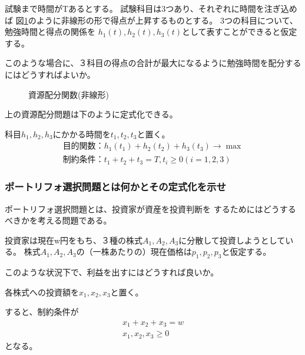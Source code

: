 \documentclass[9pt]{ltjsreport}
\begin{document}
試験まで時間がTあるとする。
試験科目は3つあり、それぞれに時間を注ぎ込めば
図\ref{fig:ResourceFunc}のように非線形の形で得点が上昇するものとする。
3つの科目について、勉強時間と得点の関係を
$h_1(t),h_2(t),h_3(t)$として表すことができると仮定する。

このような場合に、３科目の得点の合計が最大になるように勉強時間を配分するにはどうすればよいか。

\begin{figure}[h]
    \caption{資源配分関数(非線形)}
    \label{fig:ResourceFunc}
\begin{center}
\end{center}
\end{figure}

\hrulefill

上の資源配分問題は下のように定式化できる。

科目$h_1,h_2,h_3$にかかる時間を$t_1,t_2,t_3$と置く。
\begin{gather*}
    \text{目的関数：}h_1(t_1)+h_2(t_2)+h_3(t_3)\longrightarrow \max\\
    \text{制約条件：}t_1+t_2+t_3=T, t_i\ge0(i=1,2,3)
\end{gather*}

\subsubsection{ポートリフォ選択問題とは何かとその定式化を示せ}
ポートリフォ選択問題とは、投資家が資産を投資判断を
するためにはどうするべきかを考える問題である。

投資家は現在w円をもち、３種の株式$A_1,A_2,A_3$に分散して投資しようとしている。
株式$A_1,A_2,A_3$の（一株あたりの）現在価格は$p_1,p_2,p_3$と仮定する。

このような状況下で、利益を出すにはどうすれば良いか。


\hrulefill

各株式への投資額を$x_1,x_2,x_3$と置く。

すると、制約条件が
\begin{gather}
    x_1+x_2+x_3=w\\
    x_1,x_2,x_3\ge 0
\end{gather}
となる。
\end{document}
